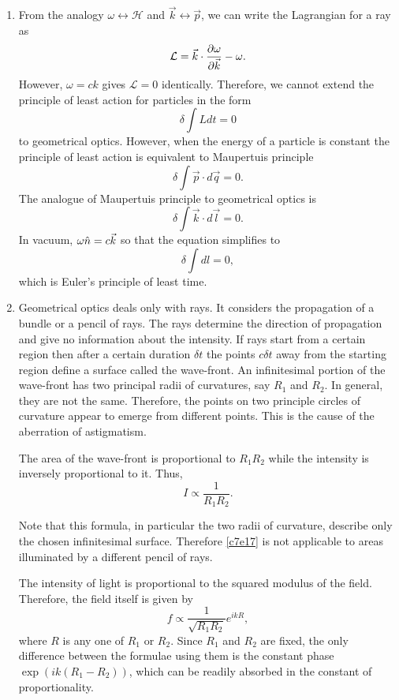 \begin{enumerate}
\item From the analogy $\omega \leftrightarrow \mathcal{H}$ and $\vec{k} 
\leftrightarrow \vec{p}$, we can write the Lagrangian for a ray as
\[
\mathcal{L} = \vec{k}\cdot\frac{\partial{\omega}}{\partial{\vec{k}}} - \omega.
\]
However, $\omega = ck$ gives $\mathcal{L} = 0$ identically. Therefore, we cannot
extend the principle of least action for particles in the form
\[
\delta\int Ldt = 0
\]
to geometrical optics. However, when the energy of a particle is constant the
principle of least action is equivalent to Maupertuis principle
\[
\delta\int\vec{p}\cdot d\vec{q} = 0.
\]
The analogue of Maupertuis principle to geometrical optics is
\begin{equation}\label{c7e15}
\delta\int\vec{k}\cdot d\vec{l} = 0.
\end{equation}
In vacuum, $\omega\hat{n} = c\vec{k}$ so that the equation simplifies to
\begin{equation}\label{c7e16}
\delta\int dl = 0,
\end{equation}
which is Euler's principle of least time.

\item Geometrical optics deals only with rays. It considers the propagation of a
bundle or a pencil of rays. The rays determine the direction of propagation and 
give no information about the intensity. If rays start from a certain region then
after a certain duration $\delta t$ the points $c\delta t$ away from the starting
region define a surface called the wave-front. An infinitesimal portion of the
wave-front has two principal radii of curvatures, say $R_1$ and $R_2$. In 
general, they are not the same. Therefore, the points on two principle circles 
of curvature appear to emerge from different points. This is the cause of the 
aberration of astigmatism.

The area of the wave-front is proportional to $R_1R_2$ while the intensity is
inversely proportional to it. Thus,
\begin{equation}\label{c7e17}
I \propto \frac{1}{R_1R_2}.
\end{equation}

Note that this formula, in particular the two radii of curvature, describe only 
the chosen infinitesimal surface. Therefore \eqref{c7e17} is not applicable to
areas illuminated by a different pencil of rays.

The intensity of light is proportional to the squared modulus of the field.
Therefore, the field itself is given by
\begin{equation}\label{c7e18}
f \propto \frac{1}{\sqrt{R_1R_2}} e^{ikR},
\end{equation}
where $R$ is any one of $R_1$ or $R_2$. Since $R_1$ and $R_2$ are fixed, the only
difference between the formulae using them is the constant phase 
$\exp(ik(R_1-R_2))$, which can be readily absorbed in the constant of 
proportionality.


\end{enumerate}
